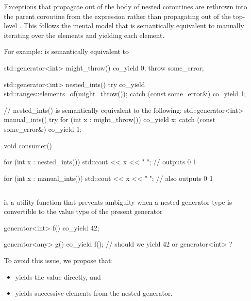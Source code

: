 \documentclass{wg21}
\begin{document}
Exceptions that propagate out of the body of nested  coroutines
are rethrown into the parent coroutine from the  expression rather
than propagating out of the top-level .
This follows the mental model that
 is semantically equivalent to
manually iterating over the elements and yielding each element.

For example:  is semantically equivalent to 
\begin{colorblock}
    std::generator<int> might_throw() {
        co_yield 0;
        throw some_error{};
    }

    std::generator<int> nested_ints() {
        try {
            co_yield std::ranges::elements_of(might_throw());
        } catch (const some_error&) {}
        co_yield 1;
    }

    // nested_ints() is semantically equivalent to the following:
    std::generator<int> manual_ints() {
        try {
            for (int x : might_throw()) {
                co_yield x;
            }
        } catch (const some_error&) {}
        co_yield 1;
    }

    void consumer() {
        for (int x : nested_ints()) {
            std::cout << x << " "; // outputs 0 1
        }

        for (int x : manual_ints()) {
            std::cout << x << " "; // also outputs 0 1
        }
    }
\end{colorblock}

\subsection{}

 is a utility function that prevents ambiguity when a nested generator type is convertible to the value type
of the present generator

\begin{colorblock}
    generator<int> f()
    {
        co_yield 42;
    }

    generator<any> g()
    {
        co_yield f(); // should we yield 42 or generator<int> ?
    }

\end{colorblock}

To avoid this issue, we propose that:
\begin{itemize}
    \item {} yields the value directly, and
    \item {} yields successive elements from the nested generator.
\end{itemize}
\end{document}
